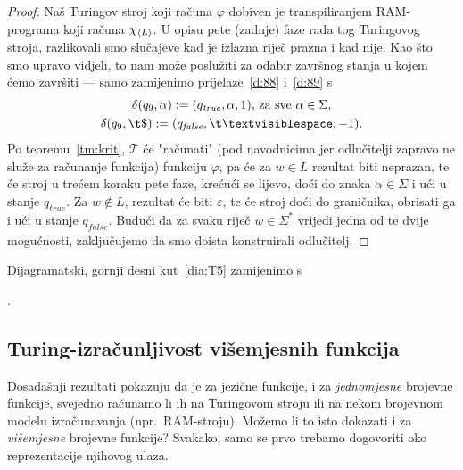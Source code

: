 \begin{proof}
Naš Turingov stroj koji računa $\varphi$ dobiven je transpiliranjem RAM-programa koji računa $\chi_{\langle L\rangle}$. U opisu pete (zadnje) faze rada tog Turingovog stroja, razlikovali smo slučajeve kad je izlazna riječ prazna i kad nije. Kao što smo upravo vidjeli, to nam može poslužiti za odabir završnog stanja u kojem ćemo završiti --- samo zamijenimo prijelaze~\eqref{d:88} i~\eqref{d:89} s
\begin{gather}
\label{eq:d88j}
    \delta(q_9,\alpha):=(q_\mathit{true},\alpha,1)\text{, za sve }\alpha\in\Sigma\text,\\
\label{eq:d89j}
    \delta(q_9,\t\$):=(q_\mathit{false},\bl,-1)\text.
\end{gather}
Po teoremu~\ref{tm:krit}, $\mathcal T$ će "računati" (pod navodnicima jer odlučitelji zapravo ne služe za računanje funkcija) funkciju $\varphi$, pa će za $w\in L$ rezultat biti neprazan, te će stroj u trećem koraku pete faze, krećući se lijevo, doći do znaka $\alpha\in\Sigma$ i ući u stanje $q_\mathit{true}$. Za $w\not\in L$, rezultat će biti $\varepsilon$, te će stroj doći do graničnika, obrisati ga i ući u stanje $q_\mathit{false}$. Budući da za svaku riječ $w\in\Sigma^*$ vrijedi jedna od te dvije mogućnosti, zaključujemo da smo doista konstruirali odlučitelj.
\end{proof}
\vspace{-4mm}

Dijagramatski, gornji desni kut~\eqref{dia:T5} zamijenimo s\quad
{}\;.

\subsection{Turing-izračunljivost višemjesnih funkcija}

Dosadašnji rezultati pokazuju da je za jezične funkcije, i za \emph{jednomjesne} brojevne funkcije, svejedno računamo li ih na Turingovom stroju ili na nekom brojevnom modelu izračunavanja (npr.\ RAM-stroju). Možemo li to isto dokazati i za \emph{višemjesne} brojevne funkcije? Svakako, samo se prvo trebamo dogovoriti oko reprezentacije njihovog ulaza.

